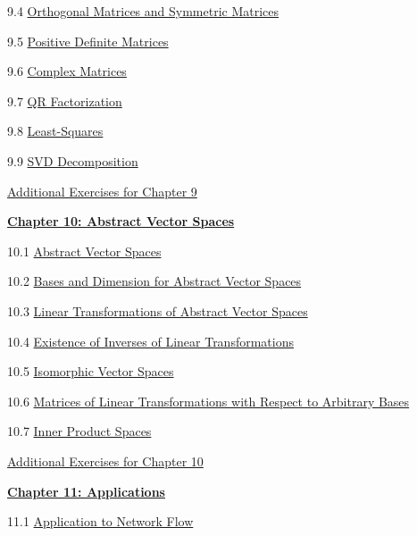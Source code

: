 \documentclass{ximera}
\begin{document}
9.4	\href{https://ximera.osu.edu/oerlinalg/LinearAlgebra/RTH-0035/main}{Orthogonal Matrices and Symmetric Matrices}
	
9.5	\href{https://ximera.osu.edu/oerlinalg/LinearAlgebra/RTH-0045/main}{Positive Definite Matrices}
	
9.6	\href{https://ximera.osu.edu/oerlinalg/LinearAlgebra/RTH-0050/main}{Complex Matrices}
	
9.7	\href{https://ximera.osu.edu/oerlinalg/LinearAlgebra/RTH-0040/main}{QR Factorization}
	
9.8	\href{https://ximera.osu.edu/oerlinalg/LinearAlgebra/RTH-0030/main}{Least-Squares}
	
9.9	\href{https://ximera.osu.edu/oerlinalg/LinearAlgebra/RTH-0060/main}{SVD Decomposition}
	
\href{https://ximera.osu.edu/oerlinalg/LinearAlgebra/SUPX-0090/main}{Additional Exercises for Chapter 9}
	
\href{https://ximera.osu.edu/oerlinalg/LinearAlgebra/XLAChapter_vecSpaces/main}{\textbf{Chapter 10: Abstract Vector Spaces}}
	
10.1	\href{https://ximera.osu.edu/oerlinalg/LinearAlgebra/VSP-0050/main}{Abstract Vector Spaces}
	
10.2	\href{https://ximera.osu.edu/oerlinalg/LinearAlgebra/VSP-0060/main}{Bases and Dimension for Abstract Vector Spaces}
	
10.3	\href{https://ximera.osu.edu/oerlinalg/LinearAlgebra/LTR-0022/main}{Linear Transformations of Abstract Vector Spaces}
	
10.4	\href{https://ximera.osu.edu/oerlinalg/LinearAlgebra/LTR-0025/main}{Existence of Inverses of Linear Transformations}
	
10.5	\href{https://ximera.osu.edu/oerlinalg/LinearAlgebra/LTR-0035/main}{Isomorphic Vector Spaces}
	
10.6	\href{https://ximera.osu.edu/oerlinalg/LinearAlgebra/LTR-0060/main}{Matrices of Linear Transformations with Respect to Arbitrary Bases}
	
10.7	\href{https://ximera.osu.edu/oerlinalg/LinearAlgebra/LTR-0080/main}{Inner Product Spaces}
	
\href{https://ximera.osu.edu/oerlinalg/LinearAlgebra/SUPX-0100/main}{Additional Exercises for Chapter 10}
	
\href{https://ximera.osu.edu/oerlinalg/LinearAlgebra/XLAChapter_applications/main}{\textbf{Chapter 11: Applications}}
	
11.1	\href{https://ximera.osu.edu/oerlinalg/LinearAlgebra/APP-0010/main}{Application to Network Flow}
	
\end{document}
